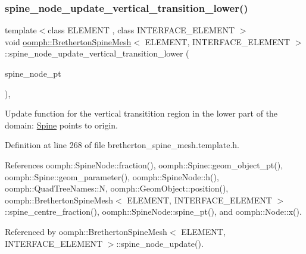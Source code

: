 \subsubsection{\texorpdfstring{spine\+\_\+node\+\_\+update\+\_\+vertical\+\_\+transition\+\_\+lower()}{spine\_node\_update\_vertical\_transition\_lower()}}
{\footnotesize\ttfamily template$<$class E\+L\+E\+M\+E\+NT , class I\+N\+T\+E\+R\+F\+A\+C\+E\+\_\+\+E\+L\+E\+M\+E\+NT $>$ \\
void \hyperlink{classoomph_1_1BrethertonSpineMesh}{oomph\+::\+Bretherton\+Spine\+Mesh}$<$ E\+L\+E\+M\+E\+NT, I\+N\+T\+E\+R\+F\+A\+C\+E\+\_\+\+E\+L\+E\+M\+E\+NT $>$\+::spine\+\_\+node\+\_\+update\+\_\+vertical\+\_\+transition\+\_\+lower (\begin{DoxyParamCaption}\item[{\hyperlink{classoomph_1_1SpineNode}{Spine\+Node} $\ast$}]{spine\+\_\+node\+\_\+pt }\end{DoxyParamCaption})\hspace{0.3cm}{\ttfamily [inline]}, {\ttfamily [protected]}}



Update function for the vertical transitition region in the lower part of the domain\+: \hyperlink{classoomph_1_1Spine}{Spine} points to origin. 



Definition at line 268 of file bretherton\+\_\+spine\+\_\+mesh.\+template.\+h.



References oomph\+::\+Spine\+Node\+::fraction(), oomph\+::\+Spine\+::geom\+\_\+object\+\_\+pt(), oomph\+::\+Spine\+::geom\+\_\+parameter(), oomph\+::\+Spine\+Node\+::h(), oomph\+::\+Quad\+Tree\+Names\+::N, oomph\+::\+Geom\+Object\+::position(), oomph\+::\+Bretherton\+Spine\+Mesh$<$ E\+L\+E\+M\+E\+N\+T, I\+N\+T\+E\+R\+F\+A\+C\+E\+\_\+\+E\+L\+E\+M\+E\+N\+T $>$\+::spine\+\_\+centre\+\_\+fraction(), oomph\+::\+Spine\+Node\+::spine\+\_\+pt(), and oomph\+::\+Node\+::x().



Referenced by oomph\+::\+Bretherton\+Spine\+Mesh$<$ E\+L\+E\+M\+E\+N\+T, I\+N\+T\+E\+R\+F\+A\+C\+E\+\_\+\+E\+L\+E\+M\+E\+N\+T $>$\+::spine\+\_\+node\+\_\+update().

\mbox{\label{classoomph_1_1BrethertonSpineMesh_a6ddc62166abfd621219551957c9b1103}} 
